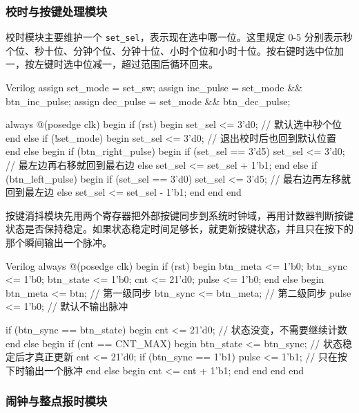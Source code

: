 \documentclass[12pt,a4paper,UTF8]{ctexart}
\begin{document}
\subsubsection{校时与按键处理模块}

校时模块主要维护一个 \texttt{set\_sel}，表示现在选中哪一位。这里规定 0-5 分别表示秒个位、秒十位、分钟个位、分钟十位、小时个位和小时十位。按右键时选中位加一，按左键时选中位减一，超过范围后循环回来。

\begin{codeblock}{Verilog}
assign set_mode = set_sw;
assign inc_pulse = set_mode && btn_inc_pulse;
assign dec_pulse = set_mode && btn_dec_pulse;

always @(posedge clk) begin
    if (rst) begin
        set_sel <= 3'd0; // 默认选中秒个位
    end else if (!set_mode) begin
        set_sel <= 3'd0; // 退出校时后也回到默认位置
    end else begin
        if (btn_right_pulse) begin
            if (set_sel == 3'd5)
                set_sel <= 3'd0; // 最左边再右移就回到最右边
            else
                set_sel <= set_sel + 1'b1;
        end else if (btn_left_pulse) begin
            if (set_sel == 3'd0)
                set_sel <= 3'd5; // 最右边再左移就回到最左边
            else
                set_sel <= set_sel - 1'b1;
        end
    end
end
\end{codeblock}

按键消抖模块先用两个寄存器把外部按键同步到系统时钟域，再用计数器判断按键状态是否保持稳定。如果状态稳定时间足够长，就更新按键状态，并且只在按下的那个瞬间输出一个脉冲。

\begin{codeblock}{Verilog}
always @(posedge clk) begin
    if (rst) begin
        btn_meta <= 1'b0;
        btn_sync <= 1'b0;
        btn_state <= 1'b0;
        cnt <= 21'd0;
        pulse <= 1'b0;
    end else begin
        btn_meta <= btn;       // 第一级同步
        btn_sync <= btn_meta;  // 第二级同步
        pulse <= 1'b0;         // 默认不输出脉冲

        if (btn_sync == btn_state) begin
            cnt <= 21'd0; // 状态没变，不需要继续计数
        end else begin
            if (cnt == CNT_MAX) begin
                btn_state <= btn_sync; // 状态稳定后才真正更新
                cnt <= 21'd0;
                if (btn_sync == 1'b1)
                    pulse <= 1'b1; // 只在按下时输出一个脉冲
            end else begin
                cnt <= cnt + 1'b1;
            end
        end
    end
end
\end{codeblock}

\subsubsection{闹钟与整点报时模块}
\end{document}
